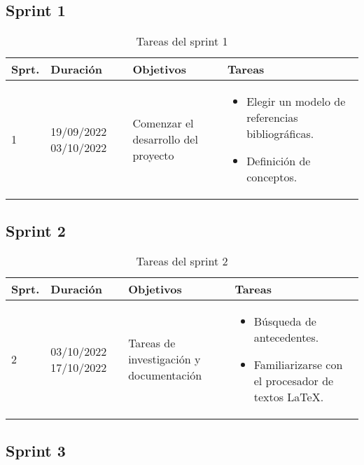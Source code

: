 \subsection{Sprint 1}

\begin{table}[h]
\centering
\begin{tabularx}{\textwidth}{llll}
\toprule
\textbf{Sprt.} & \textbf{Duración} & \textbf{Objetivos} & \textbf{Tareas}\\
\midrule
 1 & \parbox{55}{19/09/2022 03/10/2022} & \parbox{80}{Comenzar el desarrollo del proyecto} & \parbox{150}{\begin{itemize}\item Elegir un modelo de referencias bibliográficas. \item Definición de conceptos.\end{itemize}}\\
\bottomrule
\end{tabularx}
\caption{Tareas del sprint 1}
\label{tab:sprint1}
\end{table}



\subsection{Sprint 2}
\begin{table}[h]
\centering
\begin{tabularx}{\textwidth}{llll}
\toprule
\textbf{Sprt.} & \textbf{Duración} & \textbf{Objetivos} & \textbf{Tareas}\\
\midrule
 2 & \parbox{55}{03/10/2022 17/10/2022} & \parbox{80}{Tareas de investigación y documentación} & \parbox{150}{\begin{itemize}\item Búsqueda de antecedentes. \item Familiarizarse con el procesador de textos \LaTeX.\end{itemize}}\\
\bottomrule
\end{tabularx}
\caption{Tareas del sprint 2}
\label{tab:sprint2}
\end{table}


\subsection{Sprint 3}

